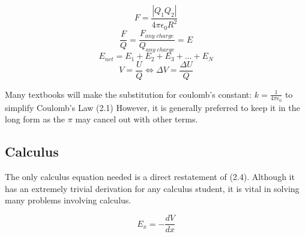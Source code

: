 \begin{equation}
    F=\frac{|Q_1Q_2|}{4\pi\epsilon_0R^2}
\end{equation}
\begin{equation}
    \frac{F}{Q}=\frac{F_{any\;charge}}{Q_{any\;charge}}=E
\end{equation}
\begin{equation}
    E_{net}=E_1+E_2+E_3+\dots+E_N
\end{equation}
\begin{equation}
    V=\frac{U}{Q} \iff
    \Delta V=\frac{\Delta U}{Q}
\end{equation}

Many textbooks will make the substitution for coulomb's constant: $k=\frac{1}{4\pi\epsilon_0}$ to simplify Coulomb's Law (2.1) However, it is generally preferred to keep it in the long form as the $\pi$ may cancel out with other terms.

\subsection*{Calculus}

The only calculus equation needed is a direct restatement of (2.4). Although it has an extremely trivial derivation for any calculus student, it is vital in solving many problems involving calculus.

\begin{equation}
    E_x=-\frac{dV}{dx}
\end{equation}
